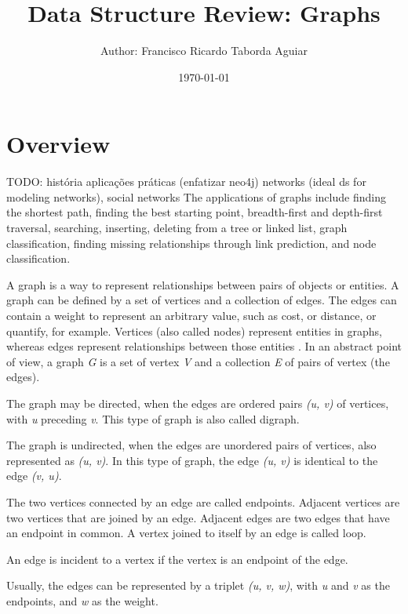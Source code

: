 \documentclass[a4paper]{article}
\title{
    Data Structure Review: Graphs\\
}
\author{
    \small{Author: Francisco Ricardo Taborda Aguiar}\\
}
\date{\today}
\begin{document}
    \maketitle


    \section{Overview}

    TODO:
    história
    aplicações práticas (enfatizar neo4j)
        networks (ideal ds for modeling networks), social networks
        The applications of graphs include finding the shortest path, 
        finding the best starting point, breadth-first and depth-first 
        traversal, searching, inserting, deleting from a tree or 
        linked list, graph classification, finding missing relationships 
        through link prediction, and node classification.

    A graph is a way to represent relationships between pairs 
    of objects \cite{goodrich:2014} or entities.
    A graph can be defined by a set of vertices and a collection 
    of edges. The edges can contain a weight to represent an 
    arbitrary value, such as cost, or distance, or quantify, 
    for example.
    Vertices (also called nodes) represent entities in graphs, 
    whereas edges represent 
    relationships between those entities \cite{xia:2021}.
    In an abstract point of view, a graph \emph{G} is a set of vertex 
    \emph{V} and a collection \emph{E} of pairs of vertex (the edges).

    The graph may be directed, when the edges are ordered pairs 
    \emph{(u, v)} of vertices, with \emph{u} preceding \emph{v}.
    This type of graph is also called digraph.

    The graph is undirected, when the edges are unordered pairs of 
    vertices, also represented as \emph{(u, v)}. In this type of 
    graph, the edge \emph{(u, v)} is identical to the edge 
    \emph{(v, u)}.

    
    The two vertices connected by an edge are called endpoints.
    Adjacent vertices are two vertices that are joined by an edge.
    Adjacent edges are two edges that have an endpoint in common.
    A vertex joined to itself by an edge is called loop.

    An edge is incident to a vertex if the vertex is an endpoint of
    the edge.

    Usually, the edges can be represented by a triplet 
    \emph{(u, v, w)}, with \emph{u} and \emph{v} as 
    the endpoints, and \emph{w} as the weight.
\end{document}

